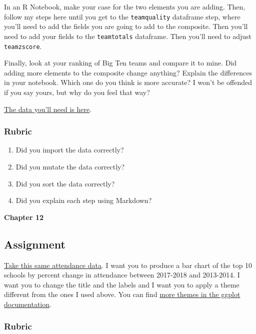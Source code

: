 \documentclass[]{book}
\providecommand{\tightlist}{%
  \setlength{\itemsep}{0pt}\setlength{\parskip}{0pt}}
\begin{document}
In an R Notebook, make your case for the two elements you are adding.
Then, follow my steps here until you get to the \texttt{teamquality}
dataframe step, where you'll need to add the fields you are going to add
to the composite. Then you'll need to add your fields to the
\texttt{teamtotals} dataframe. Then you'll need to adjust
\texttt{teamzscore}.

Finally, look at your ranking of Big Ten teams and compare it to mine.
Did adding more elements to the composite change anything? Explain the
differences in your notebook. Which one do you think is more accurate? I
won't be offended if you say yours, but why do you feel that way?

\href{https://www.dropbox.com/s/k6s758v5gwy7n4z/logs.csv?dl=0}{The data
you'll need is here}.

\subsubsection{Rubric}\label{rubric-2}

\begin{enumerate}
\def\labelenumi{\arabic{enumi}.}
\tightlist
\item
  Did you import the data correctly?
\item
  Did you mutate the data correctly?
\item
  Did you sort the data correctly?
\item
  Did you explain each step using Markdown?
\end{enumerate}

\textbf{Chapter 12}

\subsection{Assignment}\label{assignment-5}

\href{https://www.dropbox.com/s/m52dkdon3zs3ssq/attendance.csv?dl=0}{Take
this same attendance data}. I want you to produce a bar chart of the top
10 schools by percent change in attendance between 2017-2018 and
2013-2014. I want you to change the title and the labels and I want you
to apply a theme different from the ones I used above. You can find
\href{https://ggplot2.tidyverse.org/reference/ggtheme.html}{more themes
in the ggplot documentation}.

\subsubsection{Rubric}\label{rubric-3}
\end{document}
